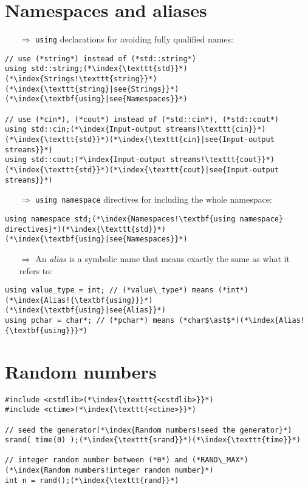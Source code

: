 \documentclass[10pt]{article}
\begin{document}
\section{Namespaces and aliases}
\small
\begin{enumerate}
\item[$\Rightarrow$] \texttt{using} declarations for avoiding fully qualified names:
\end{enumerate}
\begin{lstlisting}
// use (*string*) instead of (*std::string*)
using std::string;(*\index{\texttt{std}}*)(*\index{Strings!\texttt{string}}*)(*\index{\texttt{string}|see{Strings}}*)(*\index{\textbf{using}|see{Namespaces}}*)

// use (*cin*), (*cout*) instead of (*std::cin*), (*std::cout*)
using std::cin;(*\index{Input-output streams!\texttt{cin}}*)(*\index{\texttt{std}}*)(*\index{\texttt{cin}|see{Input-output streams}}*)
using std::cout;(*\index{Input-output streams!\texttt{cout}}*)(*\index{\texttt{std}}*)(*\index{\texttt{cout}|see{Input-output streams}}*)
\end{lstlisting}
\begin{enumerate}
\item[$\Rightarrow$] \texttt{using namespace} directives for including the whole namespace:
\end{enumerate}
\begin{lstlisting}
using namespace std;(*\index{Namespaces!\textbf{using namespace} directives}*)(*\index{\texttt{std}}*)(*\index{\textbf{using}|see{Namespaces}}*)
\end{lstlisting}
\begin{enumerate}
\item[$\Rightarrow$] An \emph{alias} is a symbolic name that means exactly the same as what it refers to:
\end{enumerate}
\begin{lstlisting}
using value_type = int; // (*value\_type*) means (*int*)(*\index{Alias!{\textbf{using}}}*)(*\index{\textbf{using}|see{Alias}}*)
using pchar = char*; // (*pchar*) means (*char$\ast$*)(*\index{Alias!{\textbf{using}}}*)
\end{lstlisting}
%
%
\section{Random numbers}
\small
\begin{lstlisting}
#include <cstdlib>(*\index{\texttt{<cstdlib>}}*)
#include <ctime>(*\index{\texttt{<ctime>}}*)

// seed the generator(*\index{Random numbers!seed the generator}*)
srand( time(0) );(*\index{\texttt{srand}}*)(*\index{\texttt{time}}*)

// integer random number between (*0*) and (*RAND\_MAX*) (*\index{Random numbers!integer random number}*)
int n = rand();(*\index{\texttt{rand}}*)
\end{lstlisting}
%
%
\end{document}

